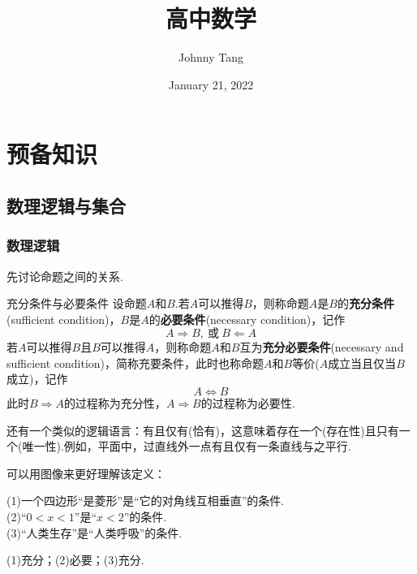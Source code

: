 \documentclass[lang=cn, zihao=4.5]{elegantbook}
\title{高中数学}
\author{Johnny Tang}
\institute{DEEP Team}
\date{January 21, 2022}
\newcommand{\tk}{\uline{\hspace{4em}}}
\begin{document}
\maketitle

\frontmatter

\mainmatter

\tableofcontents

\newpage

\part{预备知识}

\setcounter{chapter}{-1}
\chapter{数理逻辑与集合}

\section{数理逻辑}

先讨论命题之间的关系.

\begin{definition}{充分条件与必要条件} %
	设命题$A$和$B$.若$A$可以推得$B$，则称命题$A$是$B$的\textbf{充分条件}(sufficient condition)，$B$是$A$的\textbf{必要条件}(necessary condition)，记作$$A \Rightarrow B,~\text{或}~B \Leftarrow A$$
	若$A$可以推得$B$且$B$可以推得$A$，则称命题$A$和$B$互为\textbf{充分必要条件}(necessary and sufficient condition)，简称充要条件，此时也称命题$A$和$B$等价($A$成立当且仅当$B$成立)，记作$$A \Leftrightarrow B$$
	此时$B \Rightarrow A$的过程称为充分性，$A \Rightarrow B$的过程称为必要性.
\end{definition}
\begin{remark}
	还有一个类似的逻辑语言：有且仅有(恰有)，这意味着存在一个(存在性)且只有一个(唯一性).例如，平面中，过直线外一点有且仅有一条直线与之平行.
\end{remark}

可以用图像来更好理解该定义：


\begin{example}
	(1)一个四边形“是菱形”是“它的对角线互相垂直”的\tk 条件. \\
	(2)“$0<x<1$”是“$x<2$”的\tk 条件. \\
	(3)“人类生存”是“人类呼吸”的\tk 条件.
\end{example}
\begin{solution}
	(1)充分；(2)必要；(3)充分.
\end{solution}
\end{document}
